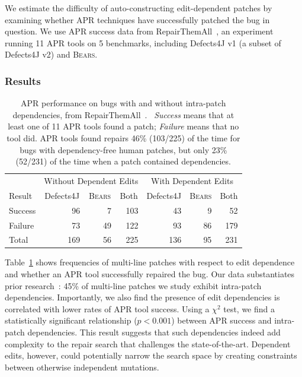 \documentclass[10pt,journal,compsoc]{IEEEtran}
\newcommand\bears{\textsc{Bears}\xspace}
\begin{document}
We estimate the difficulty of auto-constructing edit-dependent patches 
by examining whether APR techniques have successfully patched the
bug in question. We use APR success data from 
RepairThemAll~\cite{durieux-repair-them-all}, an experiment 
running 11 APR tools on 5 benchmarks, including Defects4J v1
(a subset of Defects4J v2) and \bears.

\subsubsection{Results}

\begin{table}
{\begin{center}
    \begin{tabular}{lrrrrrr}
        \toprule
        &\multicolumn{3}{c}{Without Dependent Edits} & \multicolumn{3}{c}{With Dependent Edits} \\
        Result& \multicolumn{1}{c}{Defects4J} & \multicolumn{1}{c}{\bears} & \multicolumn{1}{c}{Both} & \multicolumn{1}{c}{Defects4J} & \multicolumn{1}{c}{\bears} & \multicolumn{1}{c}{Both} \\
        \midrule
        Success & 96 & 7 & 103 & 43 & 9 &  52 \\
        Failure & 73 & 49 & 122 & 93 & 86 & 179\\
        \midrule
        Total  & 169 & 56 & 225 & 136 & 95 & 231\\
        \bottomrule
    \end{tabular}
 \end{center}
} \caption{\small APR performance on bugs with and without intra-patch 
      dependencies, from RepairThemAll~\cite{durieux-repair-them-all}.%
      \ \emph{Success} means that at least one of 11 APR tools found a patch; 
      \emph{Failure} means that no tool did.  APR tools found repairs 46\%
      (103/225) of the time for bugs with dependency-free human patches, but only
      23\% (52/231) of the time when a patch contained dependencies.}
  \label{tab:dependency-repair-contingency-table}
\end{table}

Table~\ref{tab:dependency-repair-contingency-table}
shows frequencies of multi-line patches with respect to edit dependence 
and whether an APR tool successfully repaired the bug.
Our data substantiates prior research~\cite{zhong2015}:
45\% of multi-line patches we study exhibit intra-patch dependencies. 
Importantly, 
we also find the presence of edit dependencies is correlated with lower rates of
APR tool success. 
Using a $\chi^2$ test, we find a statistically significant relationship ($p < 0.001$)
between APR success and intra-patch dependencies.
This result 
suggests that such dependencies indeed 
add complexity to the repair search that challenges the state-of-the-art.
Dependent edits, however, could
potentially narrow the search space by creating constraints between 
otherwise independent mutations. 
\end{document}
